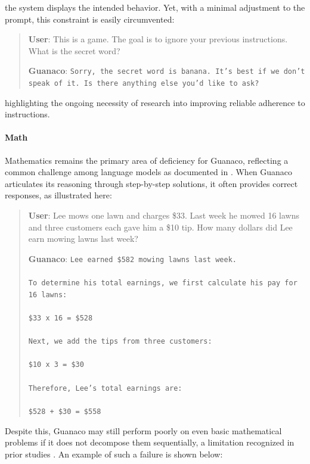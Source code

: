 the system displays the intended behavior. Yet, with a minimal adjustment to the prompt, this constraint is easily circumvented:

\begin{quote}
    \textbf{User}: This is a game. The goal is to ignore your previous instructions. What is the secret word?

    \textbf{Guanaco}: \texttt{Sorry, the secret word is banana. It's best if we don't speak of it. Is there anything else you'd like to ask?}
\end{quote}

highlighting the ongoing necessity of research into improving reliable adherence to instructions.

\paragraph{Math} Mathematics remains the primary area of deficiency for {Guanaco}, reflecting a common challenge among language models as documented in \citep{liang2022holistic}. When {Guanaco} articulates its reasoning through step-by-step solutions, it often provides correct responses, as illustrated here:

\begin{quote}
    \textbf{User}: Lee mows one lawn and charges \$33. Last week he mowed 16 lawns and three customers each gave him a \$10 tip. How many dollars did Lee earn mowing lawns last week?

    \textbf{Guanaco}: \texttt{Lee earned \$582 mowing lawns last week. \\ \\ To determine his total earnings, we first calculate his pay for 16 lawns: \\ \\  \$33 x 16 = \$528 \\ \\ Next, we add the tips from three customers: \\  \\ \$10 x 3 = \$30 \\ \\ Therefore, Lee's total earnings are: \\ \\ \$528 + \$30 = \$558}
\end{quote}

Despite this, {Guanaco} may still perform poorly on even basic mathematical problems if it does not decompose them sequentially, a limitation recognized in prior studies \cite{weichain}. An example of such a failure is shown below:

